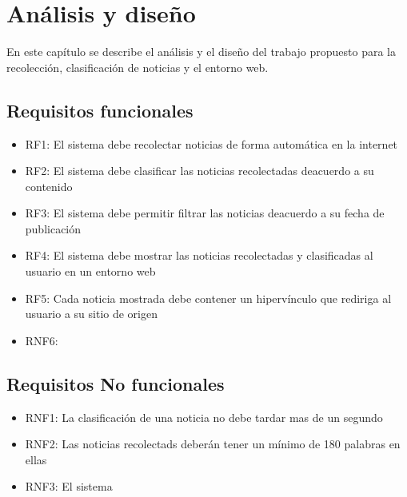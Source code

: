 \chapter{Análisis y diseño}\label{chp:introduccion}

En este capítulo se describe el análisis y el diseño del trabajo propuesto para
la recolección, clasificación de noticias y el entorno web.

\section{Requisitos funcionales}
\begin{itemize}
  \item RF1: El sistema debe recolectar noticias de forma automática en la internet
  \item RF2: El sistema debe clasificar las noticias recolectadas deacuerdo a su contenido
  \item RF3: El sistema debe permitir filtrar las noticias deacuerdo a su fecha de publicación
  \item RF4: El sistema debe mostrar las noticias recolectadas y clasificadas al usuario en un entorno web
  \item RF5: Cada noticia mostrada debe contener un hipervínculo que rediriga al usuario a su sitio de origen 
  \item RNF6:      

\end{itemize}

\section{Requisitos No funcionales}
\begin{itemize}
\section{Estructura del Documento}
  \item RNF1: La clasificación de una noticia no debe tardar mas de un segundo
  \item RNF2: Las noticias recolectads deberán tener un mínimo de 180 palabras en
  ellas
  \item RNF3: El sistema 

\end{itemize}



